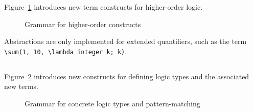 \experimental

\nodiff

Figure~\ref{fig:gram:higherorder} introduces new term constructs for
higher-order logic.

\begin{figure}[htp]
  \begin{cadre}
      
    \end{cadre}
  \caption{Grammar for higher-order constructs}
\label{fig:gram:higherorder}
\end{figure}

{\highlightnotimplemented Abstractions are only implemented for extended
  quantifiers, such as the term \lstinline|\sum(1, 10, \lambda integer k; k)|.}


\subsection{}
\label{sec:concrete-logic-types}
\experimental

\nodiff

Figure~\ref{fig:gram:logictype} introduces new constructs for defining logic
types and the associated new terms.

\begin{figure}[htp]
  \begin{cadre}
      
    \end{cadre}
  \caption{Grammar for concrete logic types and pattern-matching}
\label{fig:gram:logictype}
\end{figure}


\subsection{}
\label{sec:logicalstates}
\nodiff



